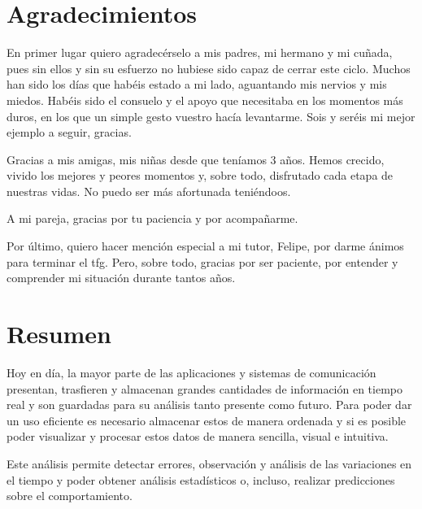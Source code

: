 \documentclass[a4paper, 12pt]{book}
\begin{document}

\chapter*{Agradecimientos}

En primer lugar quiero agradecérselo a mis padres, mi hermano y mi cuñada, pues sin ellos y sin su esfuerzo no hubiese sido capaz de cerrar este ciclo. Muchos han sido los días que habéis estado a mi lado, aguantando mis nervios y mis miedos. Habéis sido el consuelo y el apoyo que necesitaba en los momentos más duros, en los que un simple gesto vuestro hacía levantarme. Sois y seréis mi mejor ejemplo a seguir, gracias.

Gracias a mis amigas, mis niñas desde que teníamos 3 años. Hemos crecido, vivido los mejores y peores momentos y, sobre todo, disfrutado cada etapa de nuestras vidas. No puedo ser más afortunada teniéndoos.

A mi pareja, gracias por tu paciencia y por acompañarme. 

Por último, quiero hacer mención especial a mi tutor, Felipe, por darme ánimos para terminar el \acrshort{tfg}. Pero, sobre todo, gracias por ser paciente, por entender y comprender mi situación durante tantos años.


\chapter*{Resumen}

Hoy en día, la mayor parte de las aplicaciones y sistemas de comunicación presentan, trasfieren y almacenan grandes cantidades de información en tiempo real y son guardadas para su análisis tanto presente como futuro. 
Para poder dar un uso eficiente es necesario almacenar estos de manera ordenada y si es posible poder visualizar y procesar estos datos de manera sencilla, visual e intuitiva.

Este análisis permite detectar errores, observación y análisis de las variaciones en el tiempo y poder obtener análisis estadísticos o, incluso, realizar predicciones sobre el comportamiento. 
\end{document}
